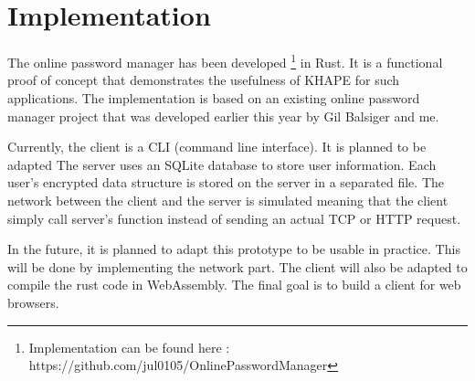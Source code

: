 ﻿\documentclass[../report.tex]{subfiles}
\begin{document}
\section{Implementation}
% 

The online password manager has been developed \footnote{Implementation can be found here : https://github.com/jul0105/OnlinePasswordManager} in Rust. It is a functional proof of concept that demonstrates the usefulness of KHAPE for such applications.
The implementation is based on an existing online password manager project that was developed earlier this year by Gil Balsiger and me.

Currently, the client is a CLI (command line interface). It is planned to be adapted
The server uses an SQLite database to store user information. Each user's encrypted data structure is stored on the server in a separated file. 
The network between the client and the server is simulated meaning that the client simply call server’s function instead of sending an actual TCP or HTTP request.

In the future, it is planned to adapt this prototype to be usable in practice. This will be done by implementing the network part. The client will also be adapted to compile the rust code in WebAssembly. The final goal is to build a client for web browsers.
\end{document}
